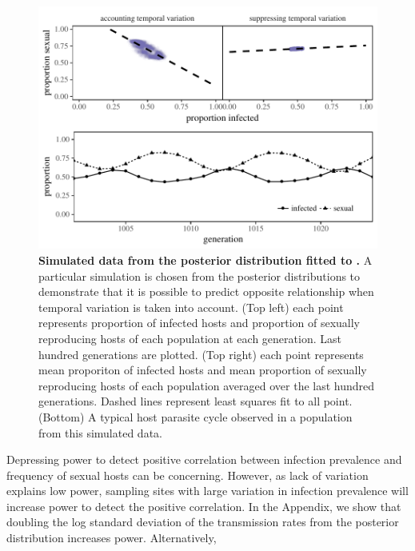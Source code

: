 \documentclass{article}\usepackage[]{graphicx}\usepackage[]{color}
\begin{document}
\begin{figure}[!htp]
\includegraphics[width=\textwidth]{../fig/cycle_example.pdf}
\caption{{\bf Simulated data from the posterior distribution fitted to \cite{vergara2014infection}.}
A particular simulation is chosen from the posterior distributions to demonstrate that it is possible to predict opposite relationship when temporal variation is taken into account. (Top left) each point represents proportion of infected hosts and proportion of sexually reproducing hosts of each population at each generation. Last hundred generations are plotted. (Top right) each point represents mean proporiton of infected hosts and mean proportion of sexually reproducing hosts of each population averaged over the last hundred generations. Dashed lines represent least squares fit to all point. (Bottom) A typical host parasite cycle observed in a population from this simulated data. %
}
\label{fig:cycle}
\end{figure}

Depressing power to detect positive correlation between infection prevalence and frequency of sexual hosts can be concerning.
However, as lack of variation explains low power, sampling sites with large variation in infection prevalence will increase power to detect the positive correlation.
In the Appendix, we show that doubling the log standard deviation of the transmission rates from the posterior distribution increases power. %
Alternatively, %



\end{document}
